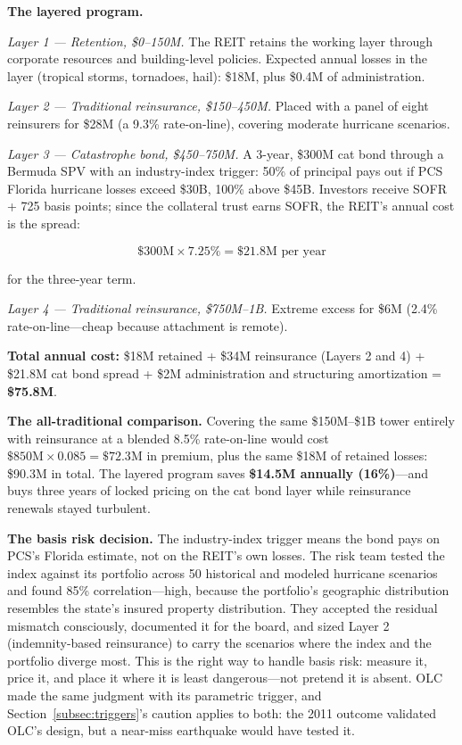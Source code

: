 \documentclass[11pt,openany]{book}
\begin{document}
\textbf{The layered program.}

\emph{Layer 1 --- Retention, \$0--150M.} The REIT retains the working layer
through corporate resources and building-level policies. Expected annual
losses in the layer (tropical storms, tornadoes, hail): \$18M, plus \$0.4M of
administration.

\emph{Layer 2 --- Traditional reinsurance, \$150--450M.} Placed with a panel
of eight reinsurers for \$28M (a 9.3\% rate-on-line), covering moderate
hurricane scenarios.

\emph{Layer 3 --- Catastrophe bond, \$450--750M.} A 3-year, \$300M cat bond
through a Bermuda SPV with an industry-index trigger: 50\% of principal pays
out if PCS Florida hurricane losses exceed \$30B, 100\% above \$45B.
Investors receive SOFR + 725 basis points; since the collateral trust earns
SOFR, the REIT's annual cost is the spread:

\[
\$300\text{M} \times 7.25\% = \$21.8\text{M per year}
\]

for the three-year term.

\emph{Layer 4 --- Traditional reinsurance, \$750M--1B.} Extreme excess for
\$6M (2.4\% rate-on-line---cheap because attachment is remote).

\textbf{Total annual cost:} \$18M retained + \$34M reinsurance (Layers 2 and
4) + \$21.8M cat bond spread + \$2M administration and structuring
amortization = \textbf{\$75.8M}.

\textbf{The all-traditional comparison.} Covering the same \$150M--\$1B tower
entirely with reinsurance at a blended 8.5\% rate-on-line would cost
\(\$850\text{M} \times 0.085 = \$72.3\text{M}\) in premium, plus the same
\$18M of retained losses: \$90.3M in total. The layered program saves
\textbf{\$14.5M annually (16\%)}---and buys three years of locked pricing on
the cat bond layer while reinsurance renewals stayed turbulent.

\textbf{The basis risk decision.} The industry-index trigger means the bond
pays on PCS's Florida estimate, not on the REIT's own losses. The risk team
tested the index against its portfolio across 50 historical and modeled
hurricane scenarios and found 85\% correlation---high, because the
portfolio's geographic distribution resembles the state's insured property
distribution. They accepted the residual mismatch consciously, documented it
for the board, and sized Layer 2 (indemnity-based reinsurance) to carry the
scenarios where the index and the portfolio diverge most. This is the right
way to handle basis risk: measure it, price it, and place it where it is
least dangerous---not pretend it is absent. OLC made the same judgment with
its parametric trigger, and Section~\ref{subsec:triggers}'s caution applies
to both: the 2011 outcome validated OLC's design, but a near-miss earthquake
would have tested it.
\end{document}
